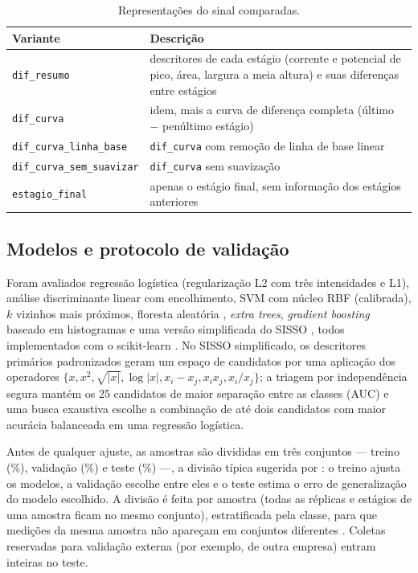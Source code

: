 \begin{table}[H]
\centering\small
\caption{Representações do sinal comparadas.}\label{tab:variantes}
\begin{tabular}{lp{10cm}}
\toprule
Variante & Descrição \\ \midrule
\texttt{dif\_resumo} & descritores de cada estágio (corrente e potencial de pico, área, largura a
meia altura) e suas diferenças entre estágios \\
\texttt{dif\_curva} & idem, mais a curva de diferença completa (último $-$ penúltimo estágio) \\
\texttt{dif\_curva\_linha\_base} & \texttt{dif\_curva} com remoção de linha de base linear \\
\texttt{dif\_curva\_sem\_suavizar} & \texttt{dif\_curva} sem suavização \\
\texttt{estagio\_final} & apenas o estágio final, sem informação dos estágios anteriores \\
\bottomrule
\end{tabular}
\end{table}

\subsection{Modelos e protocolo de validação}
Foram avaliados regressão logística (regularização L2 com três intensidades e L1), análise
discriminante linear com encolhimento, SVM com núcleo RBF (calibrada), $k$ vizinhos mais
próximos, floresta aleatória \citep{breiman2001}, \textit{extra trees}, \textit{gradient boosting}
baseado em histogramas e uma versão simplificada do SISSO \citep{ouyang2018}, todos implementados
com o scikit-learn \citep{pedregosa2011}. No SISSO simplificado, os descritores primários
padronizados geram um espaço de candidatos por uma aplicação dos operadores
$\{x, x^2, \sqrt{|x|}, \log|x|, x_i - x_j, x_i x_j, x_i/x_j\}$; a triagem por independência
segura \citep{fan2008} mantém os 25 candidatos de maior separação entre as classes (AUC) e uma
busca exaustiva escolhe a combinação de até dois candidatos com maior acurácia balanceada em uma
regressão logística.

Antes de qualquer ajuste, as amostras são divididas em três conjuntos --- treino
(\PropTreino\%), validação (\PropValidacao\%) e teste (\PropTeste\%) ---, a divisão típica
sugerida por \citet[seção~7.2]{hastie2009}: o treino ajusta os modelos, a validação escolhe entre
eles e o teste estima o erro de generalização do modelo escolhido. A divisão é feita por amostra
(todas as réplicas e estágios de uma amostra ficam no mesmo conjunto), estratificada pela classe,
para que medições da mesma amostra não apareçam em conjuntos diferentes \citep{kapoor2023}. Coletas
reservadas para validação externa (por exemplo, de outra empresa) entram inteiras no teste.

